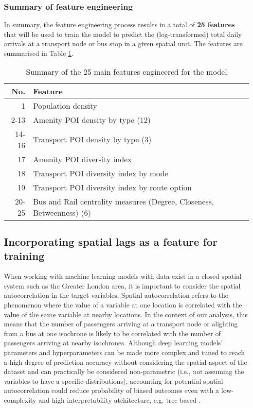\subsubsection*{Summary of feature engineering}

In summary, the feature engineering process results in a total of \textbf{25 features} that will be used to train the model to predict the (log-transformed) total daily arrivals at a transport node or bus stop in a given spatial unit. The features are summarised in Table \ref{tab:features}.

\begin{table}[ht]
    \centering
    \renewcommand{\arraystretch}{1.5}
    \begin{tabular}{|r||l|}
        \hline
        \rowcolor{lightgray}
        \textbf{No.} & \textbf{Feature} \\
        \hline
        1 & Population density \\
        2-13 & Amenity POI density by type (12) \\
        14-16 & Transport POI density by type (3) \\
        17 & Amenity POI diversity index \\
        18 & Transport POI diversity index by mode \\
        19 & Transport POI diversity index by route option \\
        20-25 & Bus and Rail centrality measures (Degree, Closeness, Betweenness) (6) \\
        \hline
    \end{tabular}
    \caption{Summary of the 25 main features engineered for the model}
    \label{tab:features}
\end{table}

\subsection{Incorporating spatial lags as a feature for training}

When working with machine learning models with data exist in a closed spatial system such as the Greater London area, it is important to consider the spatial autocorrelation in the target variables. Spatial autocorrelation refers to the phenomenon where the value of a variable at one location is correlated with the value of the same variable at nearby locations. In the context of our analysis, this means that the number of passengers arriving at a transport node or alighting from a bus at one isochrone is likely to be correlated with the number of passengers arriving at nearby isochrones. Although deep learning models' parameters and hyperparameters can be made more complex and tuned to reach a high degree of prediction accuracy without considering the spatial aspect of the dataset and can practically be considered non-parametric (i.e., not assuming the variables to have a specific distributions), accounting for potential spatial autocorrelation could reduce probability of biased outcomes even with a low-complexity and high-interpretability atchitecture, e.g. tree-based \citep{meyerImportanceSpatialPredictor2019}.

